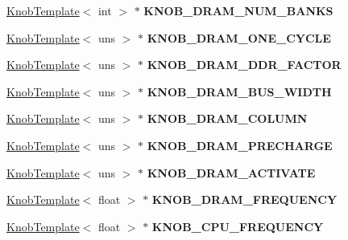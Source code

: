 \begin{DoxyCompactItemize}
\item 
\hypertarget{classall__knobs__c_aa62a4b915a4d9bd0c7826ac8b4480c33}{
\hyperlink{classKnobTemplate}{KnobTemplate}$<$ int $>$ $\ast$ {\bfseries KNOB\_\-DRAM\_\-NUM\_\-BANKS}}
\label{classall__knobs__c_aa62a4b915a4d9bd0c7826ac8b4480c33}

\item 
\hypertarget{classall__knobs__c_a30d0e1b1b0d90f9a1240bd5596d0e090}{
\hyperlink{classKnobTemplate}{KnobTemplate}$<$ uns $>$ $\ast$ {\bfseries KNOB\_\-DRAM\_\-ONE\_\-CYCLE}}
\label{classall__knobs__c_a30d0e1b1b0d90f9a1240bd5596d0e090}

\item 
\hypertarget{classall__knobs__c_a3268a4d55e3b31ab74ce7d58d8b840e0}{
\hyperlink{classKnobTemplate}{KnobTemplate}$<$ uns $>$ $\ast$ {\bfseries KNOB\_\-DRAM\_\-DDR\_\-FACTOR}}
\label{classall__knobs__c_a3268a4d55e3b31ab74ce7d58d8b840e0}

\item 
\hypertarget{classall__knobs__c_afbd4cd295548f47b77d6b5cf766dd067}{
\hyperlink{classKnobTemplate}{KnobTemplate}$<$ uns $>$ $\ast$ {\bfseries KNOB\_\-DRAM\_\-BUS\_\-WIDTH}}
\label{classall__knobs__c_afbd4cd295548f47b77d6b5cf766dd067}

\item 
\hypertarget{classall__knobs__c_a1b31bdc181a2d6117eb094e77fa7ca8a}{
\hyperlink{classKnobTemplate}{KnobTemplate}$<$ uns $>$ $\ast$ {\bfseries KNOB\_\-DRAM\_\-COLUMN}}
\label{classall__knobs__c_a1b31bdc181a2d6117eb094e77fa7ca8a}

\item 
\hypertarget{classall__knobs__c_ad003b516e06151842e5b3cfe6a3b2c64}{
\hyperlink{classKnobTemplate}{KnobTemplate}$<$ uns $>$ $\ast$ {\bfseries KNOB\_\-DRAM\_\-PRECHARGE}}
\label{classall__knobs__c_ad003b516e06151842e5b3cfe6a3b2c64}

\item 
\hypertarget{classall__knobs__c_a6f4c096da22b06b493fd85629433bd39}{
\hyperlink{classKnobTemplate}{KnobTemplate}$<$ uns $>$ $\ast$ {\bfseries KNOB\_\-DRAM\_\-ACTIVATE}}
\label{classall__knobs__c_a6f4c096da22b06b493fd85629433bd39}

\item 
\hypertarget{classall__knobs__c_aa7d873c3097ecd046446d447a07b0855}{
\hyperlink{classKnobTemplate}{KnobTemplate}$<$ float $>$ $\ast$ {\bfseries KNOB\_\-DRAM\_\-FREQUENCY}}
\label{classall__knobs__c_aa7d873c3097ecd046446d447a07b0855}

\item 
\hypertarget{classall__knobs__c_a2f09ca337eecc32c66127bec0b41700a}{
\hyperlink{classKnobTemplate}{KnobTemplate}$<$ float $>$ $\ast$ {\bfseries KNOB\_\-CPU\_\-FREQUENCY}}
\label{classall__knobs__c_a2f09ca337eecc32c66127bec0b41700a}


\end{DoxyCompactItemize}
